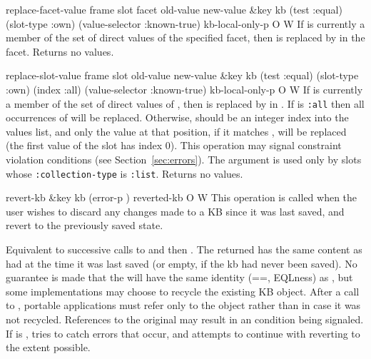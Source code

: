 \begin{okbcop}{replace-facet-value}{ frame slot facet old-value new-value \&key kb (test :equal) (slot-type :own) (value-selector :known-true) kb-local-only-p} { \void } { O } { W } {  }
If  is currently a member of the set of direct values of
   the specified facet, then  is replaced by 
    in the facet.  Returns no values.
\end{okbcop}

\begin{okbcop}{replace-slot-value}{ frame slot old-value new-value \&key kb (test :equal) (slot-type :own) (index :all) (value-selector :known-true) kb-local-only-p} { \void } { O } { W } {  }
If  is currently a member of the set of direct values of
   , then  is replaced by  in
   .  If  is {\tt :all} then all occurrences of
    will be replaced.  Otherwise,  should be
   an integer index into the values list, and only the value at that
   position, if it matches , will be replaced (the first
   value of the slot has index 0).
   This operation may signal constraint violation conditions
   (see Section~\ref{sec:errors}).  The  argument is used only
   by slots whose {\tt :collection-type} is {\tt :list}.
   Returns no values.
\end{okbcop}

\begin{okbcop}{revert-kb}{ \&key kb (error-p \true)} { reverted-kb } { O } { W } {  }
This operation is called when the user wishes to discard any changes
   made to a KB since it was last saved, and revert to the previously saved
   state.

   Equivalent to successive calls to  and then .
   The  returned has the same content as  had at
   the time it was last saved (or empty, if the kb had never
   been saved).  No guarantee is made that the 
   will have the same identity (==, EQLness) as ,
   but some implementations may choose to recycle the existing KB object.
   After a call to , portable applications must refer only
   to the  object rather than  in case it was
   not recycled.  References to the original  may result in
   an  condition being signaled.
   If  is \false, tries to catch errors that occur, and
   attempts to continue with reverting to the extent possible.
\end{okbcop}

